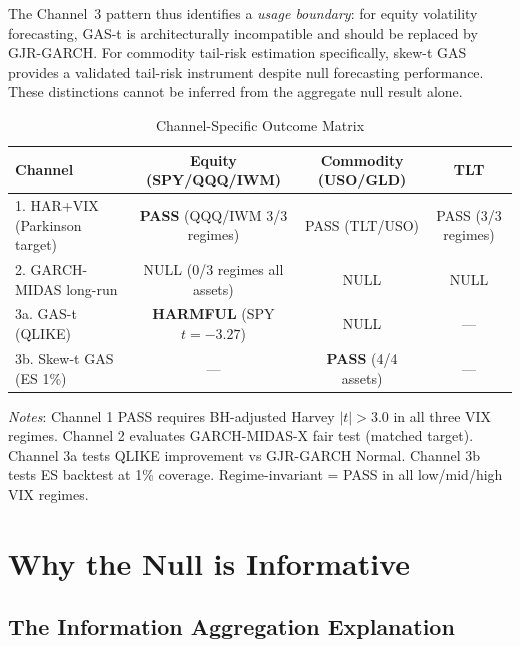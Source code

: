 \documentclass[12pt,a4paper]{article}
\begin{document}
The Channel~3 pattern thus identifies a \emph{usage boundary}: for equity volatility forecasting, GAS-t is architecturally incompatible and should be replaced by GJR-GARCH. For commodity tail-risk estimation specifically, skew-t GAS provides a validated tail-risk instrument despite null forecasting performance. These distinctions cannot be inferred from the aggregate null result alone.

\begin{table}[H]
\centering
\small
\begin{threeparttable}
\caption{Channel-Specific Outcome Matrix}
\label{tab:channel_outcomes}
\begin{tabular}{@{}lccc@{}}
\toprule
Channel & Equity (SPY/QQQ/IWM) & Commodity (USO/GLD) & TLT \\
\midrule
1. HAR+VIX (Parkinson target) & \textbf{PASS} (QQQ/IWM 3/3 regimes) & PASS (TLT/USO) & PASS (3/3 regimes) \\
2. GARCH-MIDAS long-run & NULL (0/3 regimes all assets) & NULL & NULL \\
3a. GAS-t (QLIKE) & \textbf{HARMFUL} (SPY $t=-3.27$) & NULL & --- \\
3b. Skew-t GAS (ES 1\%) & --- & \textbf{PASS} (4/4 assets) & --- \\
\bottomrule
\end{tabular}
\begin{tablenotes}
\small
\item \textit{Notes}: Channel 1 PASS requires BH-adjusted Harvey $|t|>3.0$ in all three VIX regimes. Channel 2 evaluates GARCH-MIDAS-X fair test (matched target). Channel 3a tests QLIKE improvement vs GJR-GARCH Normal. Channel 3b tests ES backtest at 1\% coverage. Regime-invariant = PASS in all low/mid/high VIX regimes.
\end{tablenotes}
\end{threeparttable}
\end{table}

\section{Why the Null is Informative}
\label{sec:null}

\subsection{The Information Aggregation Explanation}
\end{document}
